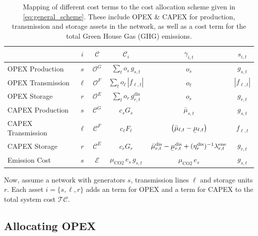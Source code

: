 \documentclass[11pt,twocolumn]{article}
\newcommand{\ubar}[1]{\underaccent{\bar}{#1}}
\newcommand{\state}{s_{i,t}}
\newcommand{\costfactor}{\gamma_{i,t}}
\newcommand{\generation}{g_{s,t}}
\newcommand{\capacitygeneration}{G_{s}}
\newcommand{\operationalpricegeneration}{o_{s}}
\newcommand{\capitalpricegeneration}{c_{s}}
\newcommand{\muuppergeneration}{\bar{\mu}_{s,t}}
\newcommand{\flow}{f_{\ell,t}}
\newcommand{\capacityflow}{F_{\ell}}
\newcommand{\operationalpriceflow}{o_\ell}
\newcommand{\capitalpriceflow}{c_{\ell}}
\newcommand{\mulowerflow}{\ubar{\mu}_{\ell,t}}
\newcommand{\muupperflow}{\bar{\mu}_{\ell,t}}
\newcommand{\storage}{g_{r,t}}
\newcommand{\storagedispatch}{\storage^\text{dis}}
\newcommand{\efficiency}{\eta_{r}}
\newcommand{\efficiencydispatch}{\efficiency^\text{dis}}
\newcommand{\operationalpricestorage}{o_r}
\newcommand{\capitalpricestorage}{c_r}
\newcommand{\capacitystorage}{G_r}
\newcommand{\mulowerstoragedispatch}{\ubar{\mu}_{r,t}^\text{dis}}
\newcommand{\muupperstoragedispatch}{\bar{\mu}_{r,t}^\text{dis}}
\newcommand{\mustateofcharge}{\lambda^\text{ene}_{r,t}}
\newcommand{\emission}{e_{s}}
\newcommand{\emissionprice}{\mu_{\text{CO2}}}
\newcommand{\totalcost}{\mathcal{TC}}
\newcommand{\cost}{\mathcal{C}}
\newcommand{\opexgeneration}{\mathcal{O}^G}
\newcommand{\opexflow}{\mathcal{O}^F}
\newcommand{\opexstorage}{\mathcal{O}^E}
\newcommand{\capexgeneration}{\mathcal{C}^G}
\newcommand{\capexflow}{\mathcal{C}^F}
\newcommand{\capexstorage}{\mathcal{C}^E}
\newcommand{\emissioncost}{\mathcal{E}}
\begin{document}
\begin{table}[t]
    \begin{center}
        \begin{tabular}{l|c|c|c|c|c}
        & $i$ & $\cost$ & $\cost_i$  & $\costfactor$ & $\state$  \\
        \toprule 
        OPEX Production & $s$ & $\opexgeneration$ & $\sum_{t} \operationalpricegeneration \, \generation$   & $\operationalpricegeneration$ & $\generation$ \\  
        OPEX Transmission  & $\ell$ & $\opexflow$ & $\sum_{t} \operationalpriceflow \, |\flow|  $ & $\operationalpriceflow$ & $|\flow|$ \\  
        OPEX Storage & $r$  & $\opexstorage$ & $\sum_{t} \operationalpricestorage \, \storagedispatch$ &  $\operationalpricestorage$ & $\storage$ \\
        \midrule   
        CAPEX Production & $s$ & $\capexgeneration$ & $ \capitalpricegeneration \capacitygeneration$ & $\muuppergeneration$ & $\generation$ \\
        CAPEX Transmission & $\ell$ & $\capexflow$ & $ \capitalpriceflow \capacityflow$ & $\left(\muupperflow - \mulowerflow \right)$ & $\flow$ \\
        CAPEX Storage & $r$ & $\capexstorage$ & $ \capitalpricestorage \capacitystorage$ & $ \muupperstoragedispatch - \mulowerstoragedispatch  + (\efficiencydispatch )^{-1} \mustateofcharge $ & $\storage$ \\
        \midrule
        Emission Cost & $s$ & $\emissioncost$ & $ \emissionprice \, \emission \, \generation$ & $\emissionprice \,\emission$ & $\generation$ \\
    \end{tabular}
    \end{center}
    \caption{Mapping of different cost terms to the cost allocation scheme given in \cref{eq:general_scheme}. These include OPEX \& CAPEX for production, transmission and storage assets in the network, as well as a cost term for the total Green House Gas (GHG) emissions.}
    \label{tab:cost_allocation_map}
\end{table}
    
Now, assume a network with generators $s$, transmission lines $\ell$ and storage units $r$. Each asset $i = \{s, \ell, r\}$ adds an term for OPEX and a term for CAPEX to the total system cost $\totalcost$.

\subsection{Allocating OPEX}
\end{document}
